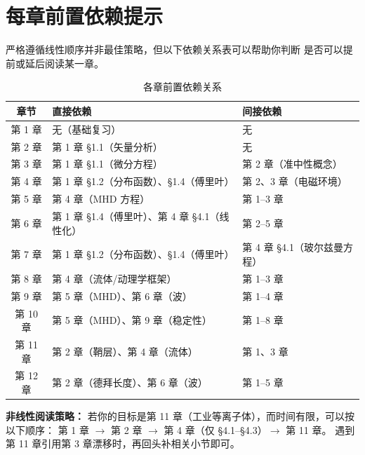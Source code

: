 \section*{每章前置依赖提示}

严格遵循线性顺序并非最佳策略，但以下依赖关系表可以帮助你判断
是否可以提前或延后阅读某一章。

\begin{table}[htbp]
\centering
\caption{各章前置依赖关系}
\begin{tabular}{@{}cll@{}}
\toprule
\textbf{章节} & \textbf{直接依赖} & \textbf{间接依赖} \\
\midrule
第 1 章 & 无（基础复习） & 无 \\
第 2 章 & 第 1 章 \S 1.1（矢量分析） & 无 \\
第 3 章 & 第 1 章 \S 1.1（微分方程） & 第 2 章（准中性概念） \\
第 4 章 & 第 1 章 \S 1.2（分布函数）、\S 1.4（傅里叶） & 第 2、3 章（电磁环境） \\
第 5 章 & 第 4 章（MHD 方程） & 第 1--3 章 \\
第 6 章 & 第 1 章 \S 1.4（傅里叶）、第 4 章 \S 4.1（线性化） & 第 2--5 章 \\
第 7 章 & 第 1 章 \S 1.2（分布函数）、\S 1.4（傅里叶） & 第 4 章 \S 4.1（玻尔兹曼方程） \\
第 8 章 & 第 4 章（流体/动理学框架） & 第 1--3 章 \\
第 9 章 & 第 5 章（MHD）、第 6 章（波） & 第 1--4 章 \\
第 10 章 & 第 5 章（MHD）、第 9 章（稳定性） & 第 1--8 章 \\
第 11 章 & 第 2 章（鞘层）、第 4 章（流体） & 第 1、3 章 \\
第 12 章 & 第 2 章（德拜长度）、第 6 章（波） & 第 1--5 章 \\
\bottomrule
\end{tabular}
\end{table}

\begin{tip}
\textbf{非线性阅读策略：}
若你的目标是第 11 章（工业等离子体），而时间有限，可以按以下顺序：
第 1 章 $\to$ 第 2 章 $\to$ 第 4 章（仅 \S 4.1--\S 4.3）$\to$ 第 11 章。
遇到第 11 章引用第 3 章漂移时，再回头补相关小节即可。
\end{tip}


